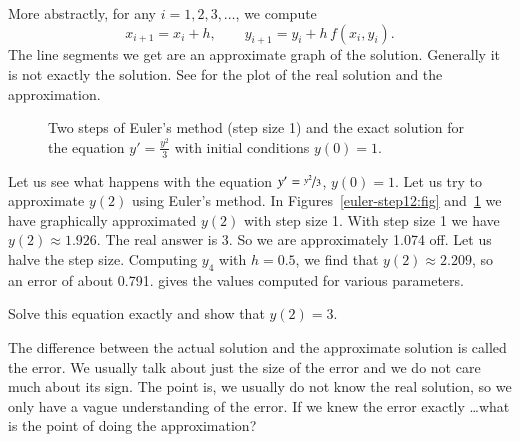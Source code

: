 \documentclass[12pt]{book}
\begin{document}
More abstractly, for any $i=1,2,3,\ldots$, we compute
\begin{equation*}
x_{i+1} = x_i + h , \qquad y_{i+1}  = y_i + h\, f(x_i,y_i) .
\end{equation*}
The line segments we get are an
approximate graph of the solution.
Generally it is not exactly the solution.  See
 for the plot of the real solution
and the approximation.

\begin{figure}[h!t]
\capstart
\begin{center}
\caption{Two steps of Euler's method (step size 1) and the exact solution for
the equation $y' = \frac{y^2}{3}$ with initial conditions $y(0)=1$.
%
\label{euler-step12-sol:fig}}
\end{center}
\end{figure}

Let us see what happens with the equation $y' = \nicefrac{y^2}{3}$, $y(0)=1$.
Let us try
to approximate $y(2)$ using Euler's method.  In
Figures~\ref{euler-step12:fig}
and~\ref{euler-step12-sol:fig} we have 
graphically approximated $y(2)$ with step size 1.  With step
size 1 we have $y(2) \approx 1.926$.  The real
answer is 3.  So we are approximately 1.074
off.  Let us halve the step size.  Computing $y_4$ with $h=0.5$,
we find that $y(2) \approx 2.209$, so an error of about 0.791.
 gives the values computed
for various parameters.

\begin{exercise}
Solve this equation exactly and show that $y(2) = 3$.
\end{exercise}

The difference between the actual solution and the approximate solution is
called the error.  We usually talk about just the size of the error
and we do not care much about its sign.  The point is, we usually
do not know the real solution, so we only have a vague understanding of the
error.  If we knew the error exactly \ldots what is the point of doing the
approximation?
\end{document}
